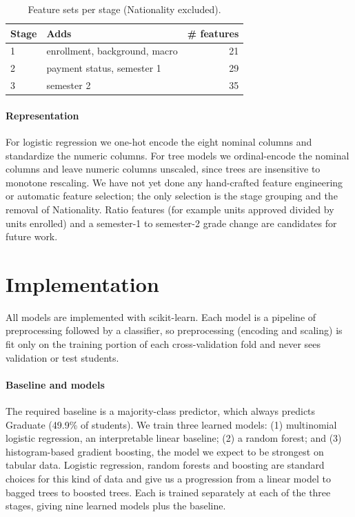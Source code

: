 \documentclass[11pt]{article}
\begin{document}
\begin{table}[t]
  \centering\small
  \begin{tabular}{llr}
    \toprule
    Stage & Adds & \# features \\
    \midrule
    1 & enrollment, background, macro & 21 \\
    2 & payment status, semester 1 & 29 \\
    3 & semester 2 & 35 \\
    \bottomrule
  \end{tabular}
  \caption{Feature sets per stage (Nationality excluded).}
  \label{tab:stages}
\end{table}

\paragraph{Representation} For logistic regression we one-hot encode the eight nominal columns and standardize the numeric columns. For tree models we ordinal-encode the nominal columns and leave numeric columns unscaled, since trees are insensitive to monotone rescaling. We have not yet done any hand-crafted feature engineering or automatic feature selection; the only selection is the stage grouping and the removal of Nationality. Ratio features (for example units approved divided by units enrolled) and a semester-1 to semester-2 grade change are candidates for future work.

\section{Implementation}
All models are implemented with scikit-learn. Each model is a pipeline of preprocessing followed by a classifier, so preprocessing (encoding and scaling) is fit only on the training portion of each cross-validation fold and never sees validation or test students.
 
\paragraph{Baseline and models} The required baseline is a majority-class predictor, which always predicts Graduate (49.9\% of students). We train three learned models: (1) multinomial logistic regression, an interpretable linear baseline; (2) a random forest; and (3) histogram-based gradient boosting, the model we expect to be strongest on tabular data. Logistic regression, random forests and boosting are standard choices for this kind of data and give us a progression from a linear model to bagged trees to boosted trees. Each is trained separately at each of the three stages, giving nine learned models plus the baseline.
 
\end{document}
